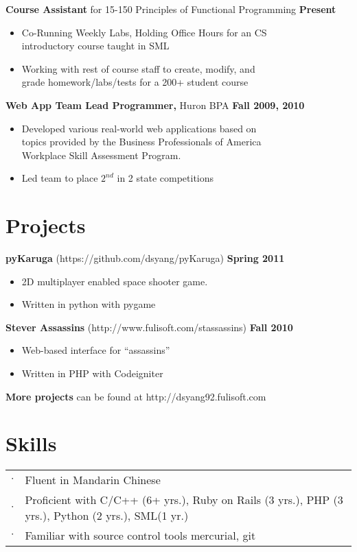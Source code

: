 \documentclass[sectioned]{dsyangres}
\begin{document}
\begin{resume}
\textbf{Course Assistant} for 15-150 Principles of Functional
 Programming \hfill \textbf{Present}
 \begin{itemize} \itemsep -2pt
   \item Co-Running Weekly Labs, Holding Office Hours for an CS\\
     introductory course taught in SML
   \item Working with rest of course staff to create, modify, and\\ 
     grade homework/labs/tests for a 200+ student course
 \end{itemize}

\textbf{Web App Team Lead Programmer, }
  Huron BPA \hfill \textbf{Fall 2009, 2010}
  \begin{itemize} \itemsep -2pt %
    \item Developed various real-world web applications based on\\
      topics provided by the Business Professionals of America \\
      Workplace Skill Assessment Program.
    \item Led team to place $2^{nd}$ in 2 state competitions
  \end{itemize}



\section{Projects}

\textbf{pyKaruga} (https://github.com/dsyang/pyKaruga) \hfill \textbf{Spring 2011}
  \begin{itemize} \itemsep -2pt
    \item 2D multiplayer enabled space shooter game.
    \item Written in python with pygame
  \end{itemize}

\textbf{Stever Assassins} (http://www.fulisoft.com/stassassins)
 \hfill \textbf{Fall 2010}
  \begin{itemize} \itemsep -2pt
    \item Web-based interface for ``assassins''
    \item Written in PHP with Codeigniter
  \end{itemize}

\textbf{More projects} can be found at http://dsyang92.fulisoft.com

\section{Skills}
  \begin{tabular}{c p{3.5in}}
    $\cdot$ & Fluent in Mandarin Chinese \\
    $\cdot$ & Proficient with C/C++ (6+ yrs.), Ruby on Rails (3 yrs.), PHP (3
       yrs.), Python (2 yrs.), SML(1 yr.)\\
    $\cdot$ & Familiar with source control tools mercurial, git\\
  \end{tabular}



\end{resume}
\end{document}
